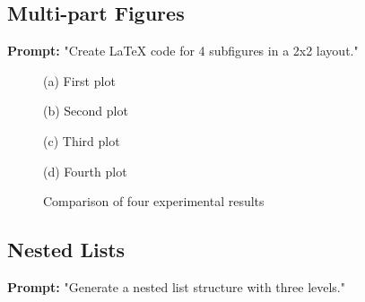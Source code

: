 \documentclass[12pt, a4paper]{article}
\begin{document}
\subsection{Multi-part Figures}

\textbf{Prompt:} "Create LaTeX code for 4 subfigures in a 2x2 layout."

\begin{figure}[h]
    \centering
    \begin{minipage}{0.48\textwidth}
        \centering
        \caption*{(a) First plot}
    \end{minipage}
    \hfill
    \begin{minipage}{0.48\textwidth}
        \centering
        \caption*{(b) Second plot}
    \end{minipage}
    
    \vspace{0.5cm}
    
    \begin{minipage}{0.48\textwidth}
        \centering
        \caption*{(c) Third plot}
    \end{minipage}
    \hfill
    \begin{minipage}{0.48\textwidth}
        \centering
        \caption*{(d) Fourth plot}
    \end{minipage}
    
    \caption{Comparison of four experimental results}
    \label{fig:multiplot}
\end{figure}

\subsection{Nested Lists}

\textbf{Prompt:} "Generate a nested list structure with three levels."
\end{document}
